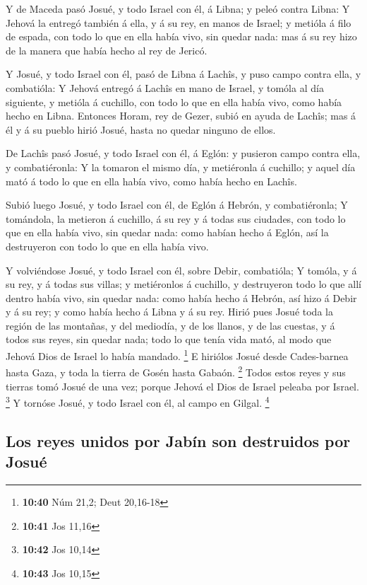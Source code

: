  Y de Maceda pasó Josué, y todo Israel con él, á Libna; y
peleó contra Libna:  Y Jehová la entregó también á ella,
y á su rey, en manos de Israel; y metióla á filo de espada, con todo lo
que en ella había vivo, sin quedar nada: mas á su rey hizo de la manera
que había hecho al rey de Jericó.

 Y Josué, y todo Israel con él, pasó de Libna á Lachîs, y
puso campo contra ella, y combatióla:  Y Jehová entregó á
Lachîs en mano de Israel, y tomóla al día siguiente, y metióla á
cuchillo, con todo lo que en ella había vivo, como había hecho en Libna.
 Entonces Horam, rey de Gezer, subió en ayuda de Lachîs;
mas á él y á su pueblo hirió Josué, hasta no quedar ninguno de ellos.

 De Lachîs pasó Josué, y todo Israel con él, á Eglón: y
pusieron campo contra ella, y combatiéronla:  Y la
tomaron el mismo día, y metiéronla á cuchillo; y aquel día mató á todo
lo que en ella había vivo, como había hecho en Lachîs.

 Subió luego Josué, y todo Israel con él, de Eglón á
Hebrón, y combatiéronla;  Y tomándola, la metieron á
cuchillo, á su rey y á todas sus ciudades, con todo lo que en ella había
vivo, sin quedar nada: como habían hecho á Eglón, así la destruyeron con
todo lo que en ella había vivo.

 Y volviéndose Josué, y todo Israel con él, sobre Debir,
combatióla;  Y tomóla, y á su rey, y á todas sus villas;
y metiéronlos á cuchillo, y destruyeron todo lo que allí dentro había
vivo, sin quedar nada: como había hecho á Hebrón, así hizo á Debir y á
su rey; y como había hecho á Libna y á su rey.  Hirió
pues Josué toda la región de las montañas, y del mediodía, y de los
llanos, y de las cuestas, y á todos sus reyes, sin quedar nada; todo lo
que tenía vida mató, al modo que Jehová Dios de Israel lo había mandado.
\footnote{\textbf{10:40} Núm 21,2; Deut 20,16-18}  E
hiriólos Josué desde Cades-barnea hasta Gaza, y toda la tierra de Gosén
hasta Gabaón. \footnote{\textbf{10:41} Jos 11,16}  Todos
estos reyes y sus tierras tomó Josué de una vez; porque Jehová el Dios
de Israel peleaba por Israel. \footnote{\textbf{10:42} Jos 10,14}
 Y tornóse Josué, y todo Israel con él, al campo en
Gilgal. \footnote{\textbf{10:43} Jos 10,15}

\hypertarget{los-reyes-unidos-por-jabuxedn-son-destruidos-por-josuuxe9}{%
\subsection{Los reyes unidos por Jabín son destruidos por
Josué}\label{los-reyes-unidos-por-jabuxedn-son-destruidos-por-josuuxe9}}

